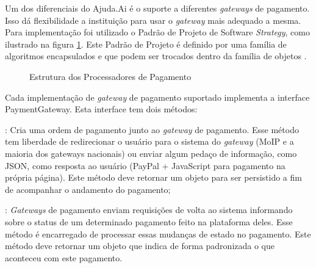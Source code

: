 Um dos diferenciais do Ajuda.Ai é o suporte a diferentes \emph{gateways} de pagamento. Isso dá flexibilidade a instituição para usar o \emph{gateway} mais adequado a mesma. Para implementação foi utilizado o Padrão de Projeto de Software \emph{Strategy}, como ilustrado na figura \ref{fig:uml_strategy}. Este Padrão de Projeto é definido por uma família de algoritmos encapsulados e que podem ser trocados dentro da família de objetos \cite{gamma1995design}.

\begin{figure}[H]
	\caption{\label{fig:uml_strategy}Estrutura dos Processadores de Pagamento}
    \centering
\end{figure}

Cada implementação de \emph{gateway} de pagamento suportado implementa a interface PaymentGateway. Esta interface tem dois métodos:

\begin{lista}
  \item \textbf{}: Cria uma ordem de pagamento junto ao \emph{gateway} de pagamento. Esse método tem liberdade de redirecionar o usuário para o sistema do \emph{gateway} (MoIP e a maioria dos gateways nacionais) ou enviar algum pedaço de informação, como JSON, como resposta ao usuário (PayPal + JavaScript para pagamento na própria página). Este método deve retornar um objeto  para ser persistido a fim de acompanhar o andamento do pagamento;

  \item \textbf{}: \emph{Gateways} de pagamento enviam requisições de volta ao sistema informando sobre o status de um determinado pagamento feito na plataforma deles. Esse método é encarregado de processar essas mudanças de estado no pagamento. Este método deve retornar um objeto  que indica de forma padronizada o que aconteceu com este pagamento.
\end{lista}

